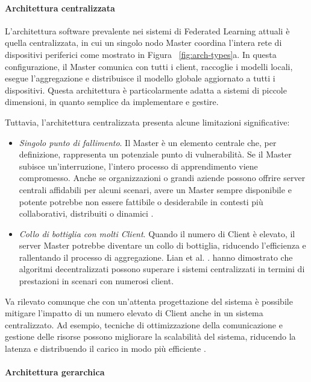 \documentclass[a4paper, oneside, openright]{report}
\begin{document}
\paragraph{Architettura centralizzata}

L'architettura software prevalente nei sistemi di Federated Learning attuali è quella centralizzata, in cui un singolo nodo Master coordina l'intera rete di dispositivi periferici come mostrato in Figura~
\ref{fig:arch-types}a. In questa configurazione, il Master comunica con tutti i client, raccoglie i modelli locali, esegue l'aggregazione e distribuisce il modello globale aggiornato a tutti i dispositivi. Questa architettura è particolarmente adatta a sistemi di piccole dimensioni, in quanto semplice da implementare e gestire.

Tuttavia, l'architettura centralizzata presenta alcune limitazioni significative:
\begin{itemize}
\item \textit{Singolo punto di fallimento}. Il Master è un elemento centrale che, per definizione, rappresenta un potenziale punto di vulnerabilità. Se il Master subisce un'interruzione, l’intero processo di apprendimento viene compromesso. Anche se organizzazioni o grandi aziende possono offrire server centrali affidabili per alcuni scenari, avere un Master sempre disponibile e potente potrebbe non essere fattibile o desiderabile in contesti più collaborativi, distribuiti o dinamici \cite{DBLP:journals/corr/VanhaesebrouckB16}.
\item \textit{Collo di bottiglia con molti Client}. Quando il numero di Client è elevato, il server Master potrebbe diventare un collo di bottiglia, riducendo l'efficienza e rallentando il processo di aggregazione. Lian et al. \cite{lian2017decentralizedalgorithmsoutperformcentralized}.
 hanno dimostrato che algoritmi decentralizzati possono superare i sistemi centralizzati in termini di prestazioni in scenari con numerosi client.
 \end{itemize}

Va rilevato comunque che con un’attenta progettazione del sistema è possibile mitigare l’impatto di un numero elevato di Client anche in un sistema centralizzato. Ad esempio, tecniche di ottimizzazione della comunicazione e gestione delle risorse possono migliorare la scalabilità del sistema, riducendo la latenza e distribuendo il carico in modo più efficiente \cite{DBLP:journals/corr/abs-1902-01046}.

\paragraph{Architettura gerarchica}
\end{document}
